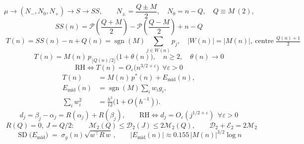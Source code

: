 \documentclass[11pt]{amsart}
\numberwithin{equation}{section}
\theoremstyle{plain}
\theoremstyle{definition}
\theoremstyle{remark}
\newcommand{\mob}{\mu}
\newcommand{\Mert}{M}
\newcommand{\Sq}{Q}
\newcommand{\PS}{\mathcal P}
\begin{document}
\begin{equation}
\label{eq:summary-map}
\mob \longrightarrow (N_-,N_0,N_+) \longrightarrow S \longrightarrow SS,
\qquad
N_\pm=\frac{\Sq\pm\Mert}2,\quad N_0=n-\Sq,\quad \Sq\equiv\Mert\ (2),
\end{equation}
\begin{equation}
\label{eq:summary-closed}
\boxed{\;
SS(n)=\PS\!\left(\frac{\Sq+\Mert}2\right)-\PS\!\left(\frac{\Sq-\Mert}2\right)+n-\Sq \;}
\end{equation}
\begin{equation}
\label{eq:summary-block}
\boxed{\;T(n)=SS(n)-n+\Sq(n)=\operatorname{sgn}(\Mert)\!\!\sum_{j\in W(n)}\!\!p_j,
\quad |W(n)|=|\Mert(n)|,\ \text{centre } \tfrac{\Sq(n)+1}2 \;}
\end{equation}
\begin{equation}
\label{eq:summary-scale}
\boxed{\;T(n)=\Mert(n)\,p_{\lfloor \Sq(n)/2\rfloor}\bigl(1+\theta(n)\bigr),\quad n\ge2,\quad \theta(n)\to0\;}
\end{equation}
\begin{equation}
\label{eq:summary-rh}
\boxed{\;\mathrm{RH}\iff T(n)=O_\varepsilon\bigl(n^{3/2+\varepsilon}\bigr)\ \ \forall\varepsilon>0\;}
\end{equation}
\begin{equation}
\label{eq:summary-residual}
\boxed{\begin{aligned}
T(n)&=\Mert(n)\,p^{*}(n)+E_{\mathrm{mid}}(n),\\
E_{\mathrm{mid}}(n)&=\operatorname{sgn}(\Mert)\sum_i w_i g_i,\\
\sum_i w_i^2&=\frac{h^3}{12}\bigl(1+O(h^{-1})\bigr).
\end{aligned}}
\end{equation}
\begin{equation}
\label{eq:summary-pairing}
\boxed{\;d_j=\beta_j-\alpha_j=R(\alpha_j)+R(\beta_j),
\qquad
\mathrm{RH}\iff d_j=O_\varepsilon(j^{1/2+\varepsilon})\ \ \forall\varepsilon>0\;}
\end{equation}
\begin{equation}
\label{eq:summary-quadratic}
\boxed{\;R(Q)=0,\ J=Q/2:\qquad
\mathcal M_2(Q)\le\mathcal D_2(J)\le2\mathcal M_2(Q),
\qquad
\mathcal D_2+\mathcal E_2=2\mathcal M_2\;}
\end{equation}
\begin{equation}
\label{eq:summary-sd}
\boxed{\;\operatorname{SD}\bigl(E_{\mathrm{mid}}\bigr)\;=\;\sigma_g(n)\sqrt{w^{\!\top}\!R\,w}\,,
\qquad
|E_{\mathrm{mid}}(n)|\approx0.155\,|\Mert(n)|^{3/2}\log n\;}
\end{equation}
\end{document}
